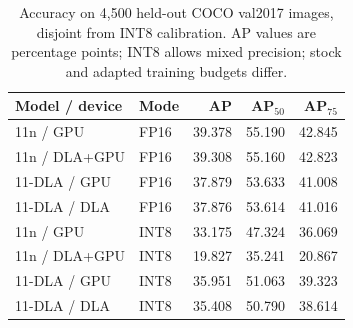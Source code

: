 \begin{table}[t]
\caption{Accuracy on 4,500 held-out COCO val2017 images, disjoint from INT8 calibration. AP values are percentage points; INT8 allows mixed precision; stock and adapted training budgets differ.}
\label{tab:accuracy}\centering\footnotesize
\setlength{\tabcolsep}{3pt}
\begin{tabular*}{\columnwidth}{@{\extracolsep{\fill}}llrrr@{}}
\toprule
Model / device & Mode & AP & AP$_{50}$ & AP$_{75}$ \\
\midrule
11n / GPU & FP16 & 39.378 & 55.190 & 42.845 \\
11n / DLA+GPU & FP16 & 39.308 & 55.160 & 42.823 \\
11-DLA / GPU & FP16 & 37.879 & 53.633 & 41.008 \\
11-DLA / DLA & FP16 & 37.876 & 53.614 & 41.016 \\
\midrule
11n / GPU & INT8 & 33.175 & 47.324 & 36.069 \\
11n / DLA+GPU & INT8 & 19.827 & 35.241 & 20.867 \\
11-DLA / GPU & INT8 & 35.951 & 51.063 & 39.323 \\
11-DLA / DLA & INT8 & 35.408 & 50.790 & 38.614 \\
\bottomrule
\end{tabular*}
\end{table}
